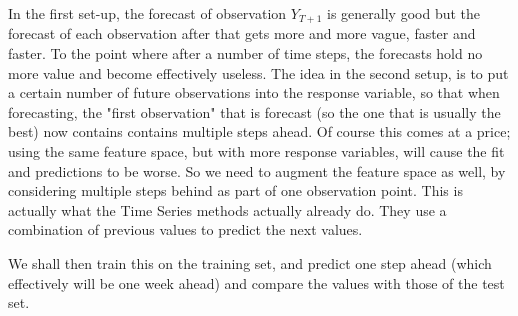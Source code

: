 In the first set-up, the forecast of observation $Y_{T+1}$ is generally good but the forecast of each observation after that gets more and more vague, faster and faster. To the point where after a number of time steps, the forecasts hold no more value and become effectively useless. The idea in the second setup, is to put a certain number of future observations into the response variable, so that when forecasting, the "first observation" that is forecast (so the one that is usually the best) now contains contains multiple steps ahead. Of course this comes at a price; using the same feature space, but with more response variables, will cause the fit and predictions to be worse. So we need to augment the feature space as well, by considering multiple steps behind as part of one observation point. This is actually what the Time Series methods actually already do. They use a combination of previous values to predict the next values.

We shall then train this on the training set, and predict one step ahead (which effectively will be one week ahead) and compare the values with those of the test set.
